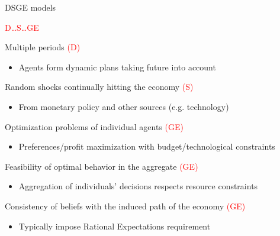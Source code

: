 \begin{frame}{DSGE models}

\begin{center}
\LARGE \textcolor{red}{D\ldots S\ldots GE}
\end{center}

Multiple periods \textcolor{red}{(D)}
	\begin{itemize}
	\item Agents form dynamic plans taking future into account
	\end{itemize}
Random shocks continually hitting the economy \textcolor{red}{(S)}
	\begin{itemize}
	\item From monetary policy and other sources (e.g. technology)
	\end{itemize}
Optimization problems of individual agents \textcolor{red}{(GE)}
	\begin{itemize}
	\item Preferences/profit maximization with budget/technological constraints
	\end{itemize}
Feasibility of optimal behavior in the aggregate \textcolor{red}{(GE)}
	\begin{itemize}
	\item Aggregation of individuals' decisions respects resource constraints
	\end{itemize}
Consistency of beliefs with the induced path of the economy \textcolor{red}{(GE)}
	\begin{itemize}
	\item Typically impose Rational Expectations requirement
	\end{itemize}

\end{frame}